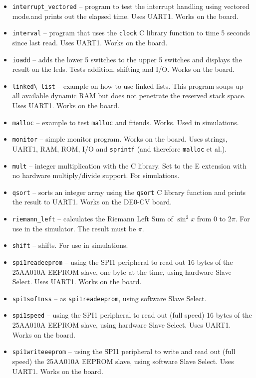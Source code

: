 \documentclass[12pt]{article}
\begin{document}
\begin{itemize}
\item \lstinline|interrupt_vectored| -- program to test the interrupt handling using vectored mode.and prints out the elapsed time. Uses UART1. Works on the board.
\item \lstinline|interval| -- program that uses the \lstinline|clock| C library function to time 5 seconds since last read. Uses UART1. Works on the board.
\item \lstinline|ioadd| -- adds the lower 5 switches to the upper 5 switches and displays the result on the leds. Tests addition, shifting and I/O. Works on the board.
\item \lstinline|linked\_list| -- example on how to use linked lists. This program soups up all available dynamic RAM but does not penetrate the reserved stack space. Uses UART1. Works on the board.
\item \lstinline|malloc| -- example to test \lstinline|malloc| and friends. Works. Used in simulations.
\item \lstinline|monitor| -- simple monitor program. Works on the board. Uses strings, UART1, RAM, ROM, I/O and \lstinline|sprintf| (and therefore \lstinline|malloc| et al.).
\item \lstinline|mult| -- integer multiplication with the C library. Set to the E extension with no hardware multiply/divide support. For simulations.
\item \lstinline|qsort| -- sorts an integer array using the \lstinline|qsort| C library function and prints the result to UART1. Works on the DE0-CV board.
\item \lstinline|riemann_left| -- calculates the Riemann Left Sum of $\sin^2 x$ from $0$ to $2\pi$. For use in the simulator. The  result must be $\pi$.
\item \lstinline|shift| -- shifts. For use in simulations.
\item \lstinline|spi1readeeprom| -- using the SPI1 peripheral to read out 16 bytes of the 25AA010A EEPROM slave, one byte at the time, using hardware Slave Select. Uses UART1. Works on the board.
\item \lstinline|spi1softnss| -- as \lstinline|spi1readeeprom|, using software Slave Select.
\item \lstinline|spi1speed| -- using the SPI1 peripheral to read out (full speed) 16 bytes of the 25AA010A EEPROM slave, using hardware Slave Select. Uses UART1. Works on the board.
\item \lstinline|spi1writeeeprom| -- using the SPI1 peripheral to write and read out (full speed) the 25AA010A EEPROM slave, using software Slave Select. Uses UART1. Works on the board.

\end{itemize}
\end{document}
